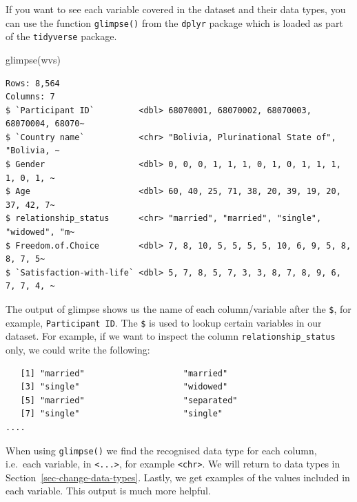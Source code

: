 \documentclass[
  letterpaper,
]{krantz}
\makeatletter
\newenvironment{Shaded}{\begin{snugshade}}{\end{snugshade}}
\newcommand{\FunctionTok}[1]{\textcolor[rgb]{0.28,0.35,0.67}{#1}}
\newcommand{\NormalTok}[1]{\textcolor[rgb]{0.00,0.23,0.31}{#1}}
\newcommand{\SpecialCharTok}[1]{\textcolor[rgb]{0.37,0.37,0.37}{#1}}
\newenvironment{kframe}{%
\medskip{}
\setlength{\fboxsep}{.8em}
 \def\at@end@of@kframe{}%
 \ifinner\ifhmode%
  \def\at@end@of@kframe{\end{minipage}}%
  \begin{minipage}{\columnwidth}%
 \fi\fi%
 \def\FrameCommand##1{\hskip\@totalleftmargin \hskip-\fboxsep
 \colorbox{shadecolor}{##1}\hskip-\fboxsep
     \hskip-\linewidth \hskip-\@totalleftmargin \hskip\columnwidth}%
 \MakeFramed {\advance\hsize-\width
   \@totalleftmargin\z@ \linewidth\hsize
   \@setminipage}}%
 {\par\unskip\endMakeFramed%
 \at@end@of@kframe}
\renewenvironment{Shaded}{\begin{kframe}}{\end{kframe}}
\makeatother
\begin{document}
If you want to see each variable covered in the dataset and their data
types, you can use the function \texttt{glimpse()} from the
\texttt{dplyr} package which is loaded as part of the \texttt{tidyverse}
package.

\begin{Shaded}
\begin{Highlighting}[]
\FunctionTok{glimpse}\NormalTok{(wvs)}
\end{Highlighting}
\end{Shaded}

\begin{verbatim}
Rows: 8,564
Columns: 7
$ `Participant ID`         <dbl> 68070001, 68070002, 68070003, 68070004, 68070~
$ `Country name`           <chr> "Bolivia, Plurinational State of", "Bolivia, ~
$ Gender                   <dbl> 0, 0, 0, 1, 1, 1, 0, 1, 0, 1, 1, 1, 1, 0, 1, ~
$ Age                      <dbl> 60, 40, 25, 71, 38, 20, 39, 19, 20, 37, 42, 7~
$ relationship_status      <chr> "married", "married", "single", "widowed", "m~
$ Freedom.of.Choice        <dbl> 7, 8, 10, 5, 5, 5, 5, 10, 6, 9, 5, 8, 8, 7, 5~
$ `Satisfaction-with-life` <dbl> 5, 7, 8, 5, 7, 3, 3, 8, 7, 8, 9, 6, 7, 7, 4, ~
\end{verbatim}

The output of glimpse shows us the name of each column/variable after
the \texttt{\$}, for example,
\texttt{\textasciigrave{}Participant\ ID\textasciigrave{}}. The
\texttt{\$} is used to lookup certain variables in our dataset. For
example, if we want to inspect the column \texttt{relationship\_status}
only, we could write the following:

\begin{Shaded}
\end{Shaded}

\begin{verbatim}
   [1] "married"                    "married"                   
   [3] "single"                     "widowed"                   
   [5] "married"                    "separated"                 
   [7] "single"                     "single"                    
....
\end{verbatim}

When using \texttt{glimpse()} we find the recognised data type for each
column, i.e.~each variable, in \texttt{\textless{}...\textgreater{}},
for example \texttt{\textless{}chr\textgreater{}}. We will return to
data types in Section~\ref{sec-change-data-types}. Lastly, we get
examples of the values included in each variable. This output is much
more helpful.
\end{document}
